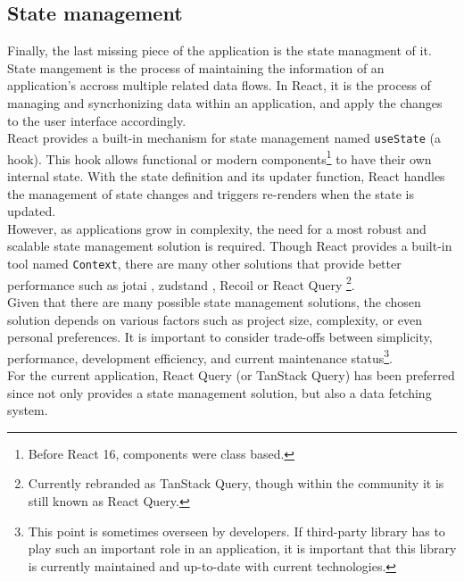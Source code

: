 \documentclass[./memory.tex]{subfiles}
\begin{document}
\subsection{State management}
Finally, the last missing piece of the application is the state managment of it.
State mangement is the process of maintaining the information of an application's
accross multiple related data flows. In React, it is the process of managing and
syncrhonizing data within an application, and apply the changes to the user
interface accordingly.
\\[8pt]
React provides a built-in mechanism for state management named
\texttt{useState} (a hook). This hook allows functional or modern
components\footnote{Before React 16, components were class based.} to have their
own internal state. With the state definition and its updater function, React
handles the management of state changes and triggers re-renders when the state
is updated.
\\
However, as applications grow in complexity, the need for a most robust and
scalable state management solution is required. Though React provides a built-in
tool named \texttt{Context}, there are many other solutions that provide better
performance such as jotai \cite{jotai}, zudstand \cite{zudstand}, Recoil \cite{recoil}
or React Query \cite{react-query}\footnote{Currently rebranded as TanStack Query,
	though within the community it is still known as React Query.}.
\\[8pt]
Given that there are many possible state management solutions, the chosen
solution depends on various factors such as project size, complexity, or even
personal preferences. It is important to consider trade-offs between simplicity,
performance, development efficiency, and current maintenance
status\footnote{This point is sometimes overseen by developers. If third-party
	library has to play such an important role in an application, it is important
	that this library is currently maintained and up-to-date with current
	technologies.}.
\\[8pt]
For the current application, React Query (or TanStack Query) has been preferred
since not only provides a state management solution, but also a data fetching
system.
\end{document}
